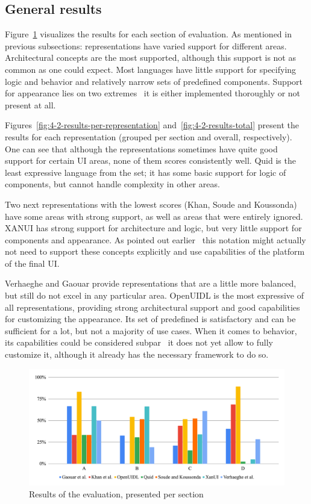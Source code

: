 \subsection{General results}\label{subsec:general-results}

Figure~\ref{fig:4-2-results-per-section} visualizes the results for each section of evaluation.
As mentioned in previous subsections: representations have varied support for different areas.
Architectural concepts are the most supported, although this support is not as common as one could expect.
Most languages have little support for specifying logic and behavior and relatively narrow sets of predefined components.
Support for appearance lies on two extremes \textendash\ it is either implemented thoroughly or not present at all.

Figures~\ref{fig:4-2-results-per-representation} and~\ref{fig:4-2-results-total} present the results for each representation (grouped per section and overall, respectively).
One can see that although the representations sometimes have quite good support for certain UI areas, none of them scores consistently well.
Quid is the least expressive language from the set;
it has some basic support for logic of components, but cannot handle complexity in other areas.

Two next representations with the lowest scores (Khan, Soude and Koussonda) have some areas with strong support, as well as areas that were entirely ignored.
XANUI has strong support for architecture and logic, but very little support for components and appearance.
As pointed out earlier \textendash\ this notation might actually not need to support these concepts explicitly and use capabilities of the platform of the final UI.

Verhaeghe and Gaouar provide representations that are a little more balanced, but still do not excel in any particular area.
OpenUIDL is the most expressive of all representations, providing strong architectural support and good capabilities for customizing the appearance.
Its set of predefined is satisfactory and can be sufficient for a lot, but not a majority of use cases.
When it comes to behavior, its capabilities could be considered subpar \textendash\ it does not yet allow to fully customize it, although it already has the necessary framework to do so.

\begin{figure}
    \centering
    \includegraphics[width=\textwidth]{4-results-and-discussion/results-per-section}
    \caption{Results of the evaluation, presented per section}
    \label{fig:4-2-results-per-section}
\end{figure}

